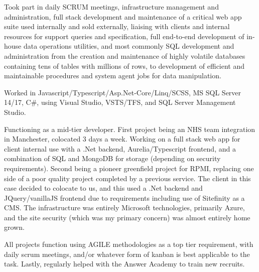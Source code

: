 \documentclass[a4paper]{cv}
\begin{document}
\begin{minipage}[t]{0.66\textwidth}
\sectionspace %



\sectionspace %


\vspace{\topsep} %
\begin{tightitemize}
\item\small Took part in daily SCRUM meetings, infrastructure management and administration, full stack development and maintenance of a critical web app suite used internally and sold externally, liaising with clients and internal resources for support queries and specification, full end-to-end development of in-house data operations utilities, and most commonly SQL development and administration from the creation and maintenance of highly volatile databases containing tens of tables with millions of rows, to development of efficient and maintainable procedures and system agent jobs for data manipulation.
\item\small Worked in Javascript/Typescript/Asp.Net-Core/Linq/SCSS, MS SQL Server 14/17, C\#, using Visual Studio, VSTS/TFS, and SQL Server Management Studio.
\end{tightitemize}

\sectionspace %


\vspace{\topsep} %
\begin{tightitemize}
\item\small Functioning as a mid-tier developer. First project being an NHS team integration in Manchester, colocated 3 days a week. Working on a full stack web app for client internal use with a .Net backend, Aurelia/Typescript frontend, and a combination of SQL and MongoDB for storage (depending on security requirements). Second being a pioneer greenfield project for RPMI, replacing one side of a poor quality project completed by a previous service. The client in this case decided to colocate to us, and this used a .Net backend and JQuery/vanillaJS frontend due to requirements including use of Sitefinity as a CMS. The infrastructure was entirely Microsoft technologies, primarily Azure, and the site security (which was my primary concern) was almost entirely home grown.
\item\small All projects function using AGILE methodologies as a top tier requirement, with daily scrum meetings, and/or whatever form of kanban is best applicable to the task. Lastly, regularly helped with the Answer Academy to train new recruits.
\end{tightitemize}


\end{minipage}
\end{document}
